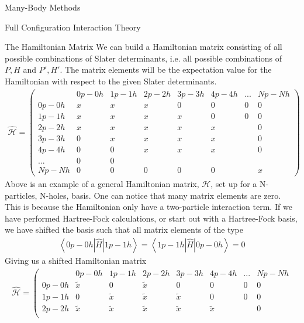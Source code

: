 \documentclass[twoside,english]{uiofysmaster}
\begin{document}
\begin{chapter}{Many-Body Methods}
\begin{section}{Full Configuration Interaction Theory}
		\begin{subsection}{The Hamiltonian Matrix}
			We can build a Hamiltonian matrix consisting of all possible combinations of Slater determinants, i.e. all possible combinations of $P,H$ and $P',H'$. The matrix elements will be the expectation value for the Hamiltonian with respect to the given Slater determinants. 
			\begin{align}
				\hat{ \mathcal{H} } = \left(  \begin{matrix}
							& 0p - 0h & 1p - 1h & 2p - 2h & 3p - 3h & 4p-4h & ... & Np - Nh \\ 
					0p - 0h & x 	  & x 		& x 	  & 0 		& 0 	& 0	  & 0 		\\		
					1p - 1h & x 	  & x 		& x 	  & x  		& 0 	& 0   & 0 		\\
					2p - 2h & x 	  & x 		& x 	  & x  		& x		& 	  & 0		\\
					3p - 3h & 0 	  & x 		& x 	  & x  		& x 	&  	  & 0 		\\
					4p - 4h & 0		  & 0 		& x 	  & x 		& x 	& 	  & 0		\\
					... 	& 0  	  & 0 	    &  	      &  		&		&     & 	    \\
					Np - Nh & 0 	  & 0		& 0 	  & 0 		& 0		&     & x
				\end{matrix} \right)
			\end{align}
			Above is an example of a general Hamiltonian matrix, $\mathcal{H}$, set up for a N-particles, N-holes, basis. One can notice that many matrix elements are zero. This is because the Hamiltonian only have a two-particle interaction term. If we have performed Hartree-Fock calculations, or start out with a Hartree-Fock basis, we have shifted the basis such that all matrix elements of the type
			\begin{align}
				\left< 0p-0h | \hat H | 1p-1h \right> = \left< 1p-1h | \hat H | 0p-0h \right> = 0
			\end{align}
			Giving us a shifted Hamiltonian matrix 
			\begin{align}
				\hat{ \mathcal{H} } = \left(  \begin{matrix}
							& 0p - 0h & 1p - 1h & 2p - 2h & 3p - 3h & 4p - 4h & ... & Np - Nh \\ 
					0p - 0h & \tilde x& 0       & \tilde x& 0 		& 0 	  & 0	& 0 		\\		
					1p - 1h & 0 	  & \tilde x& \tilde x& \tilde x& 0 	  & 0   & 0 		\\
					2p - 2h & \tilde x& \tilde x& \tilde x& \tilde x& \tilde x& 	& 0		\\

\end{matrix}
\end{align}
\end{subsection}
\end{section}
\end{chapter}
\end{document}
